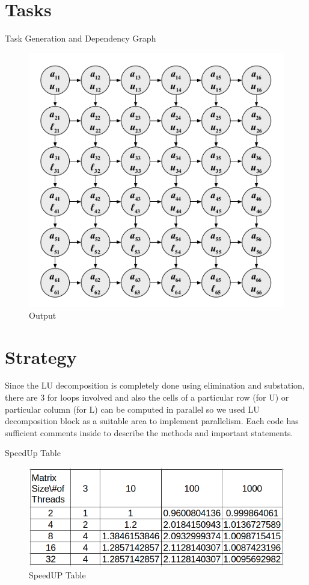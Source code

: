 \documentclass{beamer}
\begin{document}
\section{Tasks}
\begin{frame}{Task Generation and Dependency Graph}
\begin{figure}[htp]
\centering
\includegraphics[scale=.4]{pic2.png}
\caption{Output}
\end{figure}
\end{frame}

\section{Strategy}
\begin{frame}
Since the LU decomposition is completely done using elimination and substation, there are 3 for loops 
involved and also the cells of a particular row (for U) or particular column (for L) can be computed in 
parallel so we used LU decomposition block as a suitable area to implement parallelism. Each code has sufficient comments inside to describe the methods and important statements. 
\end{frame}

\begin{frame}{SpeedUp Table}
\begin{figure}[htp]
\centering
\includegraphics[scale=.4]{su.png}
\caption{SpeedUP Table}
\end{figure}
\end{frame}
\end{document}
